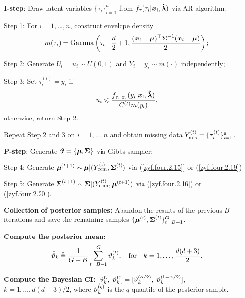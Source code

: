 \begin{algorithm}[H]  \label{zyf.four.alg1}
    \SetAlgoNoLine %

    \BlankLine

     {
        \textbf{I-step}: Draw latent variables $\{\tau_i\}_{i=1}^n$ from $f_\tau(\tau_i | {\boldsymbol{x}}_i, \mbox{\boldmath${\hat \lambda}$})$ via AR algorithm;
        
        \quad Step 1: For $i = 1, \dots, n$, construct envelope density
        $$
            m(\tau_i) = \mbox{Gamma}\left(\tau_i \;\bigg|\; \frac{d}{2} + 1, \frac{({\boldsymbol{x}}_i - {\boldsymbol{\mu}})^\top {\mbox{\boldmath$\Sigma$}}^{-1} ({\boldsymbol{x}}_i - {\boldsymbol{\mu}})}{2}\right);
        $$
            
        \quad Step 2: Generate $U_i = u_i \sim U(0, 1)$ and $Y_i = y_i \sim m(\cdot)$ independently;

        \quad Step 3: Set $\tau_i^{(t)} = y_i$ if 
        $$
            u_i \leqslant \frac{f_{\tau_i|{\boldsymbol{x}}_i}(y_i | {\boldsymbol{x}}_i, \mbox{\boldmath${\hat \lambda}$})}{C^{(t)}_{} m(y_i)},
        $$
        \hspace{1.5cm} otherwise, return Step 2.
        
        Repeat Step 2 and 3 on $i = 1, \dots, n$ and obtain missing data $Y_{\rm mis}^{(t)} = \{\tau_i^{(t)}\}_{i=1}^n$.

        \textbf{P-step}: Generate $\boldsymbol{\vartheta} = \{{\boldsymbol{\mu}}, {\mbox{\boldmath$\Sigma$}}\}$ via Gibbs sampler;

        \quad Step 4: Generate ${\boldsymbol{\mu}}^{(t+1)} \sim {\boldsymbol{\mu}}|(Y_{\rm com}^{(t)}, {\mbox{\boldmath$\Sigma$}}^{(t)})$ via (\ref{zyf.four.2.15}) or (\ref{zyf.four.2.19})

        \quad Step 5: Generate ${\mbox{\boldmath$\Sigma$}}^{(t+1)} \sim {\mbox{\boldmath$\Sigma$}}|(Y_{\rm com}^{(t)}, {\boldsymbol{\mu}}^{(t+1)})$ via (\ref{zyf.four.2.16}) or (\ref{zyf.four.2.20}).        
    }
    \textbf{Collection of posterior samples:} Abandon the results of the previous $B$ iterations and save the remaining samples $\{{\boldsymbol{\mu}}^{(t)}, {\mbox{\boldmath$\Sigma$}}^{(t)}\}_{t=B+1}^G$.

    \textbf{Compute the posterior mean:} 
    $$
        \bar{\vartheta}_k \triangleq \frac{1}{G-B} \sum_{t=B+1}^G \vartheta_k^{(t)}, \quad \mbox{for} \quad k = 1, \dots, \frac{d(d + 3)}{2}.
    $$

    \textbf{Compute the Bayesian CI:} $[\vartheta_k^{\rm L},\; \vartheta_k^{\rm U}] = [\vartheta_k^{(\alpha/2)},\; \vartheta_k^{(1-\alpha/2)}]$, $k = 1, \dots, d(d + 3) / 2$, where $\vartheta_k^{(q)}$ is the $q$-quantile of the posterior sample.
    \caption{\ Posterior mean and Bayesian CI via the DA algorithm}
\end{algorithm}
\DecMargin{0.1em}

